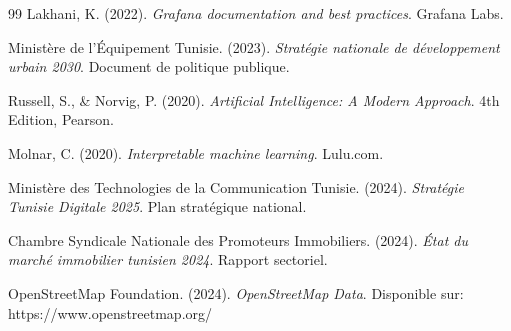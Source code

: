 \begin{thebibliography}{99}
Lakhani, K. (2022). 
\textit{Grafana documentation and best practices}. 
Grafana Labs.

Ministère de l'Équipement Tunisie. (2023). 
\textit{Stratégie nationale de développement urbain 2030}. 
Document de politique publique.

Russell, S., \& Norvig, P. (2020). 
\textit{Artificial Intelligence: A Modern Approach}. 
4th Edition, Pearson.

Molnar, C. (2020). 
\textit{Interpretable machine learning}. 
Lulu.com.

Ministère des Technologies de la Communication Tunisie. (2024). 
\textit{Stratégie Tunisie Digitale 2025}. 
Plan stratégique national.

Chambre Syndicale Nationale des Promoteurs Immobiliers. (2024). 
\textit{État du marché immobilier tunisien 2024}. 
Rapport sectoriel.

OpenStreetMap Foundation. (2024). 
\textit{OpenStreetMap Data}. 
Disponible sur: https://www.openstreetmap.org/

\end{thebibliography}

